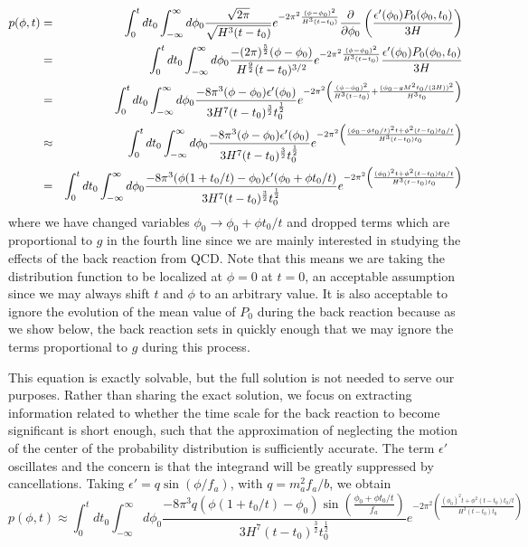 \documentclass[12pt,aps,prd,showpacs,notitlepage,nofootinbib]{revtex4-1}
\newcommand{\beq}{\begin{equation}}
\newcommand{\bea}{\begin{eqnarray}}
\newcommand{\eeq}{\end{equation}}
\newcommand{\eea}{\end{eqnarray}}
\begin{document}
\bea p(\phi,t)&=&\int_0^t dt_0 \int^\infty_{-\infty} d\phi_0\frac{\sqrt{2\pi }}{\sqrt{H^3(t-t_0)}}e^{ -2\pi^2 \frac{ (\phi-\phi_0  )^2}{H^3 (t-t_0)} } \frac{\partial}{\partial\phi_0}  \left(\frac{\epsilon'(\phi_0) P_0(\phi_0,t_0)}{3 H}\right)\cr
&=&\int_0^t dt_0 \int^\infty_{-\infty} d\phi_0\frac{- (2\pi)^{\frac52}(\phi-\phi_0)}{ H^{\frac92}(t-t_0)^{3/2}  }e^{ -2\pi^2 \frac{ (\phi-\phi_0  )^2}{H^3 (t-t_0)} }  \frac{\epsilon'(\phi_0) P_0(\phi_0,t_0)}{3 H}  \cr
&=&
\int_0^t dt_0 \int^\infty_{-\infty} d\phi_0
\frac{-8\pi^3(\phi-\phi_0)\epsilon'(\phi_0) }{ 3 H^7(t-t_0)^{\frac32}t_0^{\frac12} }
e^{ -2\pi^2 \left(
\frac{ (\phi-\phi_0  )^2}{H^3 (t-t_0)}+\frac{( \phi_0 - g M^2 t_0/(3 H) )^2}{H^3t_0} \right)
}  \cr&\approx&\int_0^t dt_0 \int^\infty_{-\infty} d\phi_0
\frac{-8\pi^3(\phi-\phi_0)\epsilon'(\phi_0) }{ 3 H^7(t-t_0)^{\frac32}t_0^{\frac12} }
e^{ -2\pi^2 \left(
\frac{ (\phi_0-\phi t_0/t)^2 t+ \phi^2(t-t_0)t_0/t  }{H^3 (t-t_0)t_0}  \right)}\cr
&=&
\int_0^t dt_0 \int^\infty_{-\infty} d\phi_0
\frac{-8\pi^3(\phi(1+t_0/t)-\phi_0)\epsilon'(\phi_0+\phi t_0/t) }{ 3 H^7(t-t_0)^{\frac32}t_0^{\frac12} }
e^{ -2\pi^2 \left(\frac{ (\phi_0)^2 t+ \phi^2(t-t_0)t_0/t  }{H^3 (t-t_0)t_0}  \right)}
  \eea
where we have changed variables $\phi_0 \rightarrow \phi_0 + \phi t_0/t$ and dropped terms which are proportional to $g$ in the fourth line since we are mainly interested in studying the effects of the back reaction from QCD. Note that this means we are taking the distribution function to be localized at $\phi=0$ at $t=0$, an acceptable assumption since we may always shift $t$ and $\phi$ to an arbitrary value. It is also acceptable to ignore the evolution of the mean value of $P_0$ during the back reaction    because as we show below, the back reaction sets in quickly enough that we may ignore the terms proportional to $g$ during this process. 

This equation is exactly solvable, but the full solution is not needed to serve our purposes. Rather than sharing the exact solution, we focus on extracting information related to whether the time scale for the back reaction to become significant is short enough, such that the approximation of neglecting the motion of the center of the probability distribution is sufficiently accurate.
The term $\epsilon'$ oscillates  and the concern is that the integrand will be greatly suppressed by cancellations. Taking $\epsilon'= q \sin(\phi/f_a)$, with $q=m_a^2 f_a/b$, we obtain
\beq
p(\phi,t) \approx \int_0^t dt_0 \int^\infty_{-\infty} d\phi_0
\frac{-8\pi^3 q(\phi(1+t_0/t)-\phi_0)\sin\left(\frac{\phi_0+\phi t_0/t}{f_a}\right) }{ 3 H^7(t-t_0)^{\frac32}t_0^{\frac12} }
e^{ -2\pi^2 \left(\frac{ (\phi_0)^2 t+ \phi^2(t-t_0)t_0/t  }{H^3 (t-t_0)t_0}  \right)}
\eeq
\end{document}
